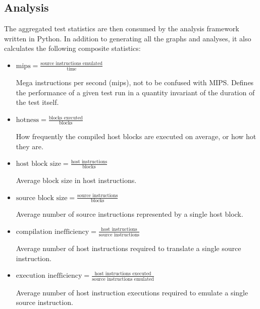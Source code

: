 \subsection{Analysis}

The aggregated test statistics are then consumed by the analysis framework written in Python. In addition to generating all the graphs and analyses, it also calculates the following composite statistics:

\begin{itemize}
    \item \textbf{$\text{mips} = \frac{\text{source instructions emulated}}{\text{time}}$}
    
    Mega instructions per second (mips), not to be confused with MIPS. Defines the performance of a given test run in a quantity invariant of the duration of the test itself.

    \item \textbf{$\text{hotness} = \frac{\text{blocks executed}}{\text{blocks}}$}
    
    How frequently the compiled host blocks are executed on average, or how hot they are.

    \item \textbf{$\text{host block size} = \frac{\text{host instructions}}{\text{blocks}}$}
    
    Average block size in host instructions.

    \item \textbf{$\text{source block size} = \frac{\text{source instructions}}{\text{blocks}}$}

    Average number of source instructions represented by a single host block.

    \item \textbf{$\text{compilation inefficiency} = \frac{\text{host instructions}}{\text{source instructions}}$}
    
    Average number of host instructions required to translate a single source instruction.
    
    \item \textbf{$\text{execution inefficiency} = \frac{\text{host instructions executed}}{\text{source instructions emulated}}$}
    
    Average number of host instruction executions required to emulate a single source instruction.
\end{itemize}